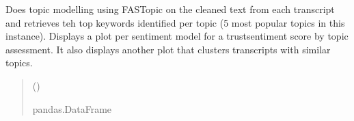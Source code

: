 \documentclass[letterpaper,10pt,english]{sphinxhowto}
\begin{document}
\begin{fulllineitems}
\label{\detokenize{_autosummary/custom_packages.modelling_modules.nlp_modelling.get_dominant_topic:custom_packages.modelling_modules.nlp_modelling.get_dominant_topic}}
\pysigstartsignatures
\pysiglinewithargsret
{}
{}
{}
\pysigstopsignatures
\sphinxAtStartPar
Does topic modelling using FASTopic on the cleaned text from each transcript and retrieves teh top keywords
identified per topic (5 most popular topics in this instance).
Displays a plot per sentiment model for a trust\sphinxhyphen{}sentiment score by topic assessment.
It also displays another plot that clusters transcripts with similar topics.
\begin{quote}\begin{description}
\sphinxAtStartPar
{} ()

\sphinxAtStartPar
pandas.DataFrame

\end{description}\end{quote}

\end{fulllineitems}




\renewcommand{\indexname}{Index}
\printindex
\end{document}
